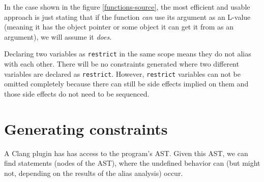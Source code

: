 In the case shown in the figure \ref{functions-source}, the most efficient and usable approach is just stating that if the function \emph{can} use its argument as an L-value (meaning it has the object pointer or some object it can get it from as an argument), we will assume it \emph{does}.

Declaring two variables as \verb|restrict| in the same scope means they do not alias with each other.
There will be no constraints generated where two different variables are declared as \verb|restrict|.
However, \verb|restrict| variables can not be omitted completely because there can still be side effects
implied on them and those side effects do not need to be sequenced.

\section{Generating constraints}
A Clang plugin has has access to the program's AST. Given this AST, we can find statements (nodes of the AST), where the undefined behavior can (but might not, depending on the results of the alias analysis) occur.
